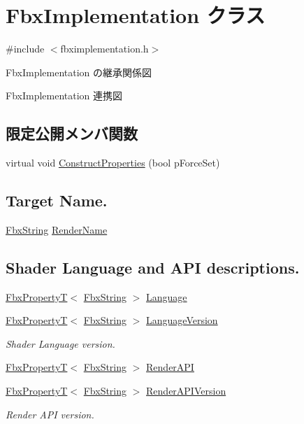 \hypertarget{class_fbx_implementation}{}\section{Fbx\+Implementation クラス}
\label{class_fbx_implementation}


{\ttfamily \#include $<$fbximplementation.\+h$>$}



Fbx\+Implementation の継承関係図


Fbx\+Implementation 連携図
\subsection*{限定公開メンバ関数}
\begin{DoxyCompactItemize}
\item 
virtual void \hyperlink{class_fbx_implementation_aba2d4d41452596b51bbb74efb21e863c}{Construct\+Properties} (bool p\+Force\+Set)
\end{DoxyCompactItemize}
\subsection*{Target Name.}
\begin{DoxyCompactItemize}
\item 
\hyperlink{class_fbx_string}{Fbx\+String} \hyperlink{class_fbx_implementation_a1c5e1e5480c227977a92668d77c13ce8}{Render\+Name}
\end{DoxyCompactItemize}
\subsection*{Shader Language and A\+PI descriptions.}
\begin{DoxyCompactItemize}
\item 
\hyperlink{class_fbx_property_t}{Fbx\+PropertyT}$<$ \hyperlink{class_fbx_string}{Fbx\+String} $>$ \hyperlink{class_fbx_implementation_acda7f6c31ffe13c69bd3dbfa972a6fac}{Language}
\item 
\hyperlink{class_fbx_property_t}{Fbx\+PropertyT}$<$ \hyperlink{class_fbx_string}{Fbx\+String} $>$ \hyperlink{class_fbx_implementation_aebb544e23225701b6e92cd058bc09bab}{Language\+Version}
\begin{DoxyCompactList}\small\item\em Shader Language version. \end{DoxyCompactList}\item 
\hyperlink{class_fbx_property_t}{Fbx\+PropertyT}$<$ \hyperlink{class_fbx_string}{Fbx\+String} $>$ \hyperlink{class_fbx_implementation_ac127174c10e30bdf28d2e276c7818302}{Render\+A\+PI}
\item 
\hyperlink{class_fbx_property_t}{Fbx\+PropertyT}$<$ \hyperlink{class_fbx_string}{Fbx\+String} $>$ \hyperlink{class_fbx_implementation_a66ac67e482f39a4e71389f33f1c69648}{Render\+A\+P\+I\+Version}
\begin{DoxyCompactList}\small\item\em Render A\+PI version. \end{DoxyCompactList}\end{DoxyCompactItemize}

